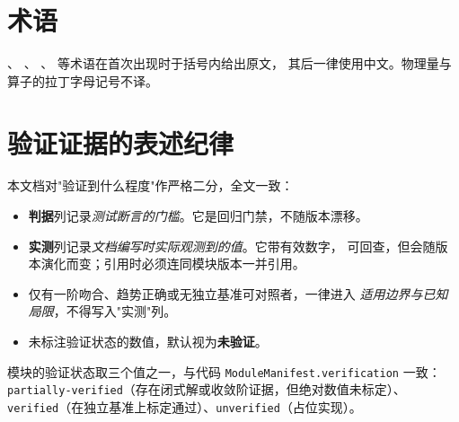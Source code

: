 \section*{术语}

、
、
、
 等术语在首次出现时于括号内给出原文，
其后一律使用中文。物理量与算子的拉丁字母记号不译。

\section*{验证证据的表述纪律}

本文档对"验证到什么程度"作严格二分，全文一致：

\begin{itemize}[leftmargin=1.7em,itemsep=0.25em,topsep=0.3em]
  \item \textbf{判据}列记录\emph{测试断言的门槛}。它是回归门禁，不随版本漂移。
  \item \textbf{实测}列记录\emph{文档编写时实际观测到的值}。它带有效数字，
        可回查，但会随版本演化而变；引用时必须连同模块版本一并引用。
  \item 仅有一阶吻合、趋势正确或无独立基准可对照者，一律进入
        \emph{适用边界与已知局限}，不得写入"实测"列。
  \item 未标注验证状态的数值，默认视为\textbf{未验证}。
\end{itemize}

模块的验证状态取三个值之一，与代码 \texttt{ModuleManifest.verification} 一致：
\texttt{partially-verified}（存在闭式解或收敛阶证据，但绝对数值未标定）、
\texttt{verified}（在独立基准上标定通过）、\texttt{unverified}（占位实现）。

\cleardoublepage
